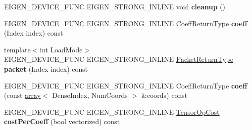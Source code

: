 \begin{DoxyCompactItemize}
\mbox{\label{struct_eigen_1_1_tensor_evaluator_3_01const_01_derived_00_01_device_01_4_a5fd6c294c436073f5090b7646c7c19cf}} 
E\+I\+G\+E\+N\+\_\+\+D\+E\+V\+I\+C\+E\+\_\+\+F\+U\+NC E\+I\+G\+E\+N\+\_\+\+S\+T\+R\+O\+N\+G\+\_\+\+I\+N\+L\+I\+NE void {\bfseries cleanup} ()
\item 
\mbox{\label{struct_eigen_1_1_tensor_evaluator_3_01const_01_derived_00_01_device_01_4_ad111d3510f1085df9cbfc8c0d914421b}} 
E\+I\+G\+E\+N\+\_\+\+D\+E\+V\+I\+C\+E\+\_\+\+F\+U\+NC E\+I\+G\+E\+N\+\_\+\+S\+T\+R\+O\+N\+G\+\_\+\+I\+N\+L\+I\+NE Coeff\+Return\+Type {\bfseries coeff} (Index index) const
\item 
\mbox{\label{struct_eigen_1_1_tensor_evaluator_3_01const_01_derived_00_01_device_01_4_a893c096407edf69c98665f81e814b1fa}} 
{\footnotesize template$<$int Load\+Mode$>$ }\\E\+I\+G\+E\+N\+\_\+\+D\+E\+V\+I\+C\+E\+\_\+\+F\+U\+NC E\+I\+G\+E\+N\+\_\+\+S\+T\+R\+O\+N\+G\+\_\+\+I\+N\+L\+I\+NE \hyperlink{group___sparse_core___module}{Packet\+Return\+Type} {\bfseries packet} (Index index) const
\item 
\mbox{\label{struct_eigen_1_1_tensor_evaluator_3_01const_01_derived_00_01_device_01_4_a3bd2544ac94201d32e291c734208870d}} 
E\+I\+G\+E\+N\+\_\+\+D\+E\+V\+I\+C\+E\+\_\+\+F\+U\+NC E\+I\+G\+E\+N\+\_\+\+S\+T\+R\+O\+N\+G\+\_\+\+I\+N\+L\+I\+NE Coeff\+Return\+Type {\bfseries coeff} (const \hyperlink{class_eigen_1_1array}{array}$<$ Dense\+Index, Num\+Coords $>$ \&coords) const
\item 
\mbox{\label{struct_eigen_1_1_tensor_evaluator_3_01const_01_derived_00_01_device_01_4_a44668d5954b4c921409b6e5e7fdf8cb5}} 
E\+I\+G\+E\+N\+\_\+\+D\+E\+V\+I\+C\+E\+\_\+\+F\+U\+NC E\+I\+G\+E\+N\+\_\+\+S\+T\+R\+O\+N\+G\+\_\+\+I\+N\+L\+I\+NE \hyperlink{class_eigen_1_1_tensor_op_cost}{Tensor\+Op\+Cost} {\bfseries cost\+Per\+Coeff} (bool vectorized) const
\item 
\mbox{\label{struct_eigen_1_1_tensor_evaluator_3_01const_01_derived_00_01_device_01_4_a7116f5a2d0edcc46589cbe53910bff7c}} 

\end{DoxyCompactItemize}
